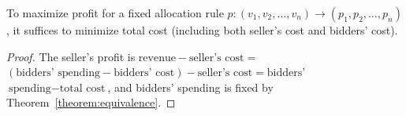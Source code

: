 \begin{corollary}
To maximize profit for a fixed allocation rule $p: (v_1, v_2, \ldots, v_n)
\rightarrow (p_1, p_2, \ldots, p_n)$, it suffices to minimize total cost
(including both seller's cost and bidders' cost).
\end{corollary}
\begin{proof}
The seller's profit is $\text{revenue} - \text{seller's cost} =$\\$
(\text{bidders' spending} - \text{bidders' cost}) - \text{seller's cost} = 
\text{bidders'}$\\$ \text{spending} - \text{total cost}$, and bidders' spending is
fixed by Theorem~\ref{theorem:equivalence}.
\end{proof}



